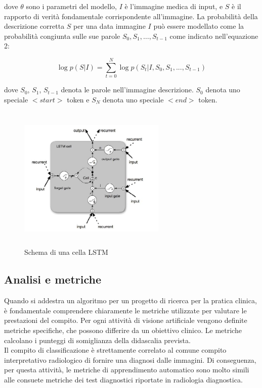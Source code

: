 \documentclass[12pt,a4paper]{report}
\begin{document}
dove $\theta$ sono i parametri del modello, $I$ è l'immagine medica di input, e $S$ è il rapporto di verità fondamentale corrispondente all'immagine. La probabilità della descrizione corretta $S$ per una data immagine $I$ può essere modellato come la probabilità congiunta sulle sue parole $S_0, S_1, … ,S_{t-1}$ come indicato nell'equazione 2:

\begin{equation}
{\displaystyle \log p(S|I) =  \sum\limits_{t = 0}^{N} \log p(S_t | I, S_0, S_1, ..., S_{t-1})}
\end{equation}

dove $S_0$, $S_1$, $S_{t-1}$ denota le parole nell'immagine descrizione. $S_0$ denota uno speciale $<start>$ token e $S_N$ denota uno speciale $<end>$ token.

\begin{figure}[h!]
    \begin{center}
        \includegraphics[width=7cm,height=7cm,keepaspectratio]{diagram_LSTM}
    \end{center}
    \caption{Schema di una cella LSTM}
    \label{fig:LSTM-schema}
\end{figure}

\subsection{Analisi e metriche}
Quando si addestra un algoritmo per un progetto di ricerca per la pratica clinica, è fondamentale comprendere chiaramente le metriche utilizzate per valutare le prestazioni del compito. Per ogni attività di visione artificiale vengono definite metriche specifiche, che possono differire da un obiettivo clinico. Le metriche calcolano i punteggi di somiglianza della didascalia prevista.\\
Il compito di classificazione è strettamente correlato al comune compito interpretativo radiologico di fornire una diagnosi dalle immagini. Di conseguenza, per questa attività, le metriche di apprendimento automatico sono molto simili alle consuete metriche dei test diagnostici riportate in radiologia diagnostica.
\end{document}

